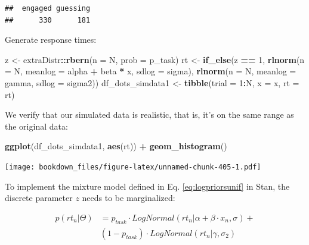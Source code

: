 \documentclass[12pt,]{krantz}
\newenvironment{Shaded}{\begin{snugshade}}{\end{snugshade}}
\newcommand{\KeywordTok}[1]{\textcolor[rgb]{0.13,0.29,0.53}{\textbf{#1}}}
\newcommand{\DataTypeTok}[1]{\textcolor[rgb]{0.13,0.29,0.53}{#1}}
\newcommand{\DecValTok}[1]{\textcolor[rgb]{0.00,0.00,0.81}{#1}}
\newcommand{\StringTok}[1]{\textcolor[rgb]{0.31,0.60,0.02}{#1}}
\newcommand{\OperatorTok}[1]{\textcolor[rgb]{0.81,0.36,0.00}{\textbf{#1}}}
\newcommand{\NormalTok}[1]{#1}
\theoremstyle{definition}
\theoremstyle{definition}
\theoremstyle{definition}
\theoremstyle{remark}
\begin{document}
\begin{verbatim}
##  engaged guessing 
##      330      181
\end{verbatim}

Generate response times:

\begin{Shaded}
\begin{Highlighting}[]
\NormalTok{z <-}\StringTok{ }\NormalTok{extraDistr}\OperatorTok{::}\KeywordTok{rbern}\NormalTok{(}\DataTypeTok{n =}\NormalTok{ N, }\DataTypeTok{prob =}\NormalTok{ p_task)}
\NormalTok{rt <-}\StringTok{ }\KeywordTok{if_else}\NormalTok{(z }\OperatorTok{==}\StringTok{ }\DecValTok{1}\NormalTok{,}
             \KeywordTok{rlnorm}\NormalTok{(}\DataTypeTok{n =}\NormalTok{ N, }\DataTypeTok{meanlog =}\NormalTok{ alpha }\OperatorTok{+}\StringTok{ }\NormalTok{beta }\OperatorTok{*}\StringTok{ }\NormalTok{x, }\DataTypeTok{sdlog =}\NormalTok{ sigma),}
             \KeywordTok{rlnorm}\NormalTok{(}\DataTypeTok{n =}\NormalTok{ N, }\DataTypeTok{meanlog =}\NormalTok{ gamma, }\DataTypeTok{sdlog =}\NormalTok{ sigma2))}
\NormalTok{df_dots_simdata1 <-}\StringTok{ }\KeywordTok{tibble}\NormalTok{(}\DataTypeTok{trial =} \DecValTok{1}\OperatorTok{:}\NormalTok{N, }\DataTypeTok{x =}\NormalTok{ x, }\DataTypeTok{rt =}\NormalTok{ rt)}
\end{Highlighting}
\end{Shaded}

We verify that our simulated data is realistic, that is, it's on the
same range as the original data:

\begin{Shaded}
\begin{Highlighting}[]
\KeywordTok{ggplot}\NormalTok{(df_dots_simdata1, }\KeywordTok{aes}\NormalTok{(rt)) }\OperatorTok{+}
\StringTok{  }\KeywordTok{geom_histogram}\NormalTok{()}
\end{Highlighting}
\end{Shaded}

\texttt{[image: bookdown\_files/figure-latex/unnamed-chunk-405-1.pdf]}

To implement the mixture model defined in Eq. \eqref{eq:logpriorsunif} in
Stan, the discrete parameter \(z\) needs to be marginalized:

\begin{equation}
\begin{aligned}
p(rt_n | \Theta) &= p_{task} \cdot LogNormal(rt_n | \alpha + \beta \cdot x_n, \sigma) +\\ 
    & (1 - p_{task}) \cdot LogNormal(rt_n | \gamma, \sigma_2)
\end{aligned}
\end{equation}
\end{document}
